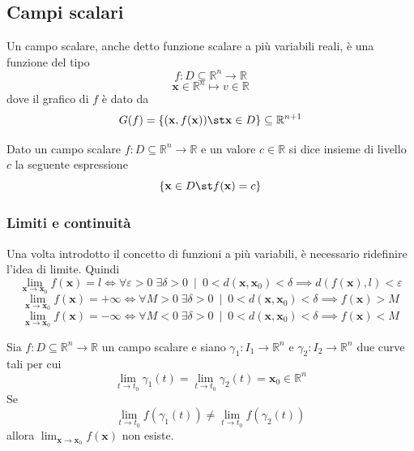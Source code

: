         \subsection{Campi scalari}
            Un campo scalare, anche detto funzione scalare a più variabili reali, è una funzione del tipo
            \[
                f: D \subseteq \mathbb{R}^{n} \rightarrow \mathbb{R}
            \]
            \[
                \mathbf{x} \in \mathbb{R}^{n} \mapsto v \in \mathbb{R}
            \]
            dove il grafico di $f$ è dato da
            \[
                G(f) = \{ (\mathbf{x}, f(\mathbf{x})) \st \mathbf{x} \in D\} \subseteq \mathbb{R}^{n+1}
            \]

            Dato un campo scalare $f: D \subseteq \mathbb{R}^{n} \rightarrow \mathbb{R}$ e un valore $c \in \mathbb{R}$ si dice insieme di livello $c$ la seguente espressione
            \[
                \{ \mathbf{x} \in D \st f(\mathbf{x}) = c\}
            \]

            \subsubsection{Limiti e continuità}
            Una volta introdotto il concetto di funzioni a più variabili, è necessario ridefinire l'idea di limite. Quindi
            \[
                \lim_{\mathbf{x} \rightarrow \mathbf{x}_0} f(\mathbf{x}) = l \iff \forall \varepsilon > 0 \; \exists \delta > 0 \;\: | \;\: 0 < d(\mathbf{x}, \mathbf{x}_0) < \delta \implies d(f(\mathbf{x}), l) < \varepsilon
            \]
            \[
                \lim_{\mathbf{x} \rightarrow \mathbf{x}_0} f(\mathbf{x}) = +\infty \iff \forall M > 0 \; \exists \delta > 0 \;\: | \;\: 0 < d(\mathbf{x}, \mathbf{x}_0) < \delta \implies f(\mathbf{x}) > M
            \]
            \[
                \lim_{\mathbf{x} \rightarrow \mathbf{x}_0} f(\mathbf{x}) = -\infty \iff \forall M < 0 \; \exists \delta > 0 \;\: | \;\: 0 < d(\mathbf{x}, \mathbf{x}_0) < \delta \implies f(\mathbf{x}) < M
            \]

            \begin{theorem} 
                Sia $f: D \subseteq \mathbb{R}^{n} \rightarrow \mathbb{R}$ un campo scalare e siano $\gamma_1: I_{1} \rightarrow \mathbb{R}^{n}$ e $\gamma_{2}: I_{2} \rightarrow \mathbb{R}^{n}$ due curve tali per cui
                \[
                    \lim_{t \rightarrow t_0} \gamma_{1}(t) = \lim_{t \rightarrow t_0} \gamma_{2}(t) = \mathbf{x}_0 \in \mathbb{R}^{n}
                \]
                Se
                \[
                    \lim_{t \rightarrow t_0} f(\gamma_{1}(t)) \neq \lim_{t \rightarrow t_0} f(\gamma_{2}(t))
                \]
                allora $\displaystyle \lim_{\mathbf{x} \rightarrow \mathbf{x}_0} f(\mathbf{x})$ non esiste.
            \end{theorem}

